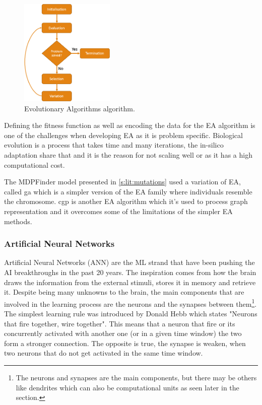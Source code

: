 \begin{figure}[!htb]
  \centering\includegraphics[width=0.4\textwidth,height=0.4\textheight,keepaspectratio]{Images/Resources/EA_basic.png}
    \caption{Evolutionary Algorithms algorithm.}
    \label{fig:ea_basic}
\end{figure}
\FloatBarrier


Defining the fitness function as well as encoding the data for the EA algorithm is one of the challenges when developing EA as it is problem specific. Biological evolution is a process that takes time and many iterations, the in-silico adaptation share that and it is the reason for not scaling well or as it has a high computational cost.

The MDPFinder model presented in \cref{s:lit:mutations} used a variation of EA, called \acrfull{ga} which is a simpler version of the EA family where individuals resemble the chromosome. \acrfull{cgp} is another EA algorithm which it's used to process graph representation and it overcomes some of the limitations of the simpler EA methods. 


\subsubsection{Artificial Neural Networks} \label{s:lit:ann_overview}

Artificial Neural Networks (ANN) are the ML strand that have been pushing the AI breakthroughs in the past 20 years. The inspiration comes from how the brain draws the information from the external stimuli, stores it in memory and retrieve it. Despite being many unknowns to the brain, the main components that are involved in the learning process are the neurons and the synapses between them\footnote{The neurons and synapses are the main components, but there may be others like dendrites which can also be computational units as seen later in the section.}. The simplest learning rule was introduced by Donald Hebb which states "Neurons that fire together, wire together"\cite{Hebb_Donald1949-nn}. This means that a neuron that fire or its concurrently activated with another one (or in a given time window) the two form a stronger connection. The opposite is true, the synapse is weaken, when two neurons that do not get activated in the same time window.

